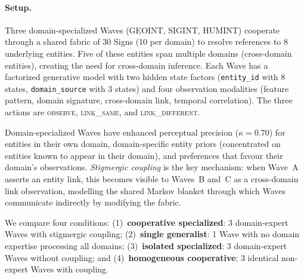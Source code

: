 \documentclass[11pt,a4paper]{article}
\theoremstyle{definition}
\begin{document}
\paragraph{Setup.} Three domain-specialized Waves (GEOINT, SIGINT, HUMINT) cooperate through a shared fabric of 30 Signs (10 per domain) to resolve references to 8 underlying entities. Five of these entities span multiple domains (cross-domain entities), creating the need for cross-domain inference. Each Wave has a factorized generative model with two hidden state factors (\texttt{entity\_id} with 8 states, \texttt{domain\_source} with 3 states) and four observation modalities (feature pattern, domain signature, cross-domain link, temporal correlation). The three actions are \textsc{observe}, \textsc{link\_same}, and \textsc{link\_different}.

Domain-specialized Waves have enhanced perceptual precision ($\kappa = 0.70$) for entities in their own domain, domain-specific entity priors (concentrated on entities known to appear in their domain), and preferences that favour their domain's observations. \emph{Stigmergic coupling} is the key mechanism: when Wave~A asserts an entity link, this becomes visible to Waves~B and~C as a cross-domain link observation, modelling the shared Markov blanket through which Waves communicate indirectly by modifying the fabric.

We compare four conditions: (1)~\textbf{cooperative specialized}: 3 domain-expert Waves with stigmergic coupling; (2)~\textbf{single generalist}: 1 Wave with no domain expertise processing all domains; (3)~\textbf{isolated specialized}: 3 domain-expert Waves without coupling; and (4)~\textbf{homogeneous cooperative}: 3 identical non-expert Waves with coupling.
\end{document}
